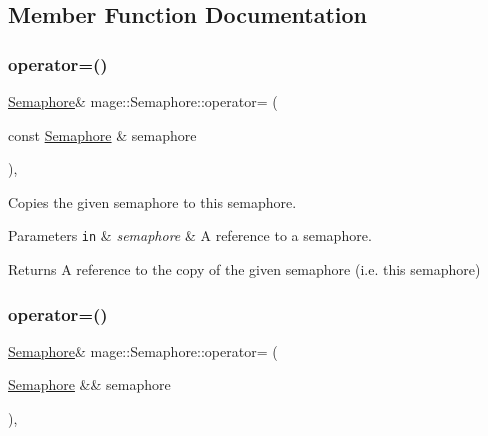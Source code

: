 \subsection{Member Function Documentation}
\hypertarget{classmage_1_1_semaphore_af3308cf7fa1ed33cda0ee53b9565f658}{}\label{classmage_1_1_semaphore_af3308cf7fa1ed33cda0ee53b9565f658} 
\subsubsection{\texorpdfstring{operator=()}{operator=()}\hspace{0.1cm}{\footnotesize\ttfamily [1/2]}}
{\footnotesize\ttfamily \hyperlink{classmage_1_1_semaphore}{Semaphore}\& mage\+::\+Semaphore\+::operator= (\begin{DoxyParamCaption}\item[{const \hyperlink{classmage_1_1_semaphore}{Semaphore} \&}]{semaphore }\end{DoxyParamCaption})\hspace{0.3cm}{\ttfamily [private]}, {\ttfamily [delete]}}

Copies the given semaphore to this semaphore.


\begin{DoxyParams}[1]{Parameters}
\mbox{\tt in}  & {\em semaphore} & A reference to a semaphore. \\
\hline
\end{DoxyParams}
\begin{DoxyReturn}{Returns}
A reference to the copy of the given semaphore (i.\+e. this semaphore) 
\end{DoxyReturn}
\hypertarget{classmage_1_1_semaphore_a7ce33136147e745f75d51abc77cd845c}{}\label{classmage_1_1_semaphore_a7ce33136147e745f75d51abc77cd845c} 
\subsubsection{\texorpdfstring{operator=()}{operator=()}\hspace{0.1cm}{\footnotesize\ttfamily [2/2]}}
{\footnotesize\ttfamily \hyperlink{classmage_1_1_semaphore}{Semaphore}\& mage\+::\+Semaphore\+::operator= (\begin{DoxyParamCaption}\item[{\hyperlink{classmage_1_1_semaphore}{Semaphore} \&\&}]{semaphore }\end{DoxyParamCaption})\hspace{0.3cm}{\ttfamily [private]}, {\ttfamily [delete]}}

